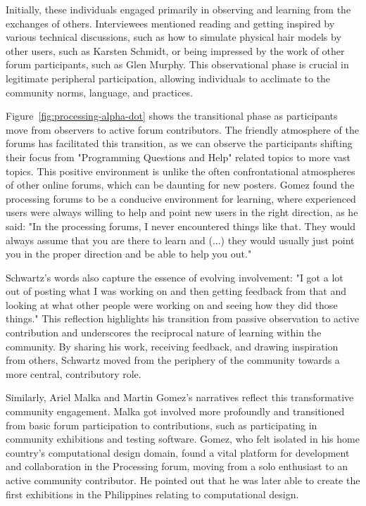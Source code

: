 Initially, these individuals engaged primarily in observing and learning from the exchanges of others. Interviewees mentioned reading and getting inspired by various technical discussions, such as how to simulate physical hair models by other users, such as Karsten Schmidt, or being impressed by the work of other forum participants, such as Glen Murphy. This observational phase is crucial in legitimate peripheral participation, allowing individuals to acclimate to the community norms, language, and practices.

Figure~\ref{fig:processing-alpha-dot} shows the transitional phase as participants move from observers to active forum contributors. The friendly atmosphere of the forums has facilitated this transition, as we can observe the participants shifting their focus from "Programming Questions and Help" related topics to more vast topics. This positive environment is unlike the often confrontational atmospheres of other online forums, which can be daunting for new posters. Gomez found the processing forums to be a conducive environment for learning, where experienced users were always willing to help and point new users in the right direction, as he said: "In the processing forums, I never encountered things like that. They would always assume that you are there to learn and (...) they would usually just point you in the proper direction and be able to help you out."

Schwartz's words also capture the essence of evolving involvement: "I got a lot out of posting what I was working on and then getting feedback from that and looking at what other people were working on and seeing how they did those things." This reflection highlights his transition from passive observation to active contribution and underscores the reciprocal nature of learning within the community. By sharing his work, receiving feedback, and drawing inspiration from others, Schwartz moved from the periphery of the community towards a more central, contributory role.

Similarly, Ariel Malka and Martin Gomez's narratives reflect this transformative community engagement. Malka got involved more profoundly and transitioned from basic forum participation to contributions, such as participating in community exhibitions and testing software. Gomez, who felt isolated in his home country's computational design domain, found a vital platform for development and collaboration in the Processing forum, moving from a solo enthusiast to an active community contributor. He pointed out that he was later able to create the first exhibitions in the Philippines relating to computational design.

